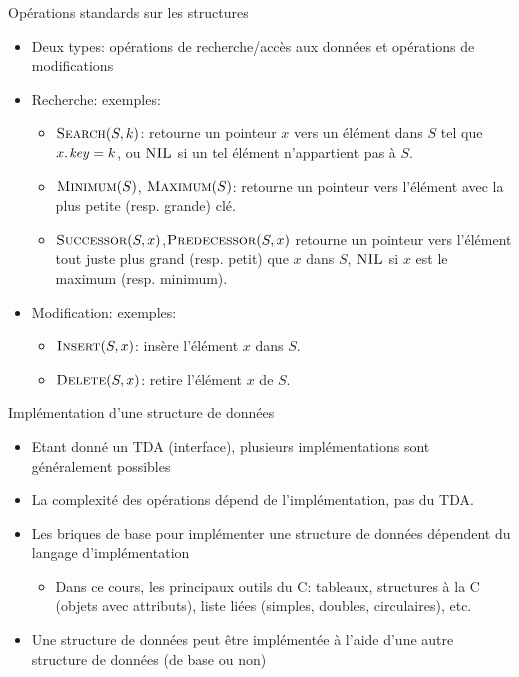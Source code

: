 \begin{frame}{Opérations standards sur les structures}

\begin{itemize}
\item Deux types: opérations de recherche/accès aux données et opérations de modifications
\item Recherche: exemples:
\begin{itemize}
\item $\textnormal{\scshape Search}(S,k)$: retourne un pointeur $x$ vers un élément dans $S$ tel que $\attrib{x}{key}=k$, ou $\textnormal{\scshape NIL}$ si un tel élément n'appartient pas à $S$.
\item $\textnormal{\scshape Minimum}(S)$, $\textnormal{\scshape Maximum}(S)$: retourne un pointeur
  vers l'élément avec la plus petite (resp. grande) clé.
\item $\textnormal{\scshape Successor}(S,x)$,$\textnormal{\scshape Predecessor}(S,x)$ retourne un pointeur vers l'élément tout juste plus grand (resp. petit) que $x$ dans $S$, $\textnormal{\scshape NIL}$ si $x$ est le maximum (resp. minimum).
\end{itemize}
\item Modification: exemples:
\begin{itemize}
\item $\textnormal{\scshape Insert}(S,x)$: insère l'élément $x$ dans $S$.
\item $\textnormal{\scshape Delete}(S,x)$: retire l'élément $x$ de $S$.
\end{itemize}
\end{itemize}

\end{frame}

\begin{frame}{Implémentation d'une structure de données}
\begin{itemize}
\item Etant donné un TDA (interface), plusieurs implémentations sont généralement possibles
\item La complexité des opérations dépend de l'implémentation, \alert{pas du TDA}.

\bigskip

\item Les briques de base pour implémenter une structure de données
  dépendent du langage d'implémentation
\begin{itemize}
\item Dans ce cours, les principaux outils du C: tableaux, structures
  à la C (objets avec attributs), liste liées (simples, doubles,
  circulaires), etc.
\end{itemize}
\item Une structure de données peut être implémentée à l'aide d'une
  autre structure de données (de base ou non)
\end{itemize}
\end{frame}


